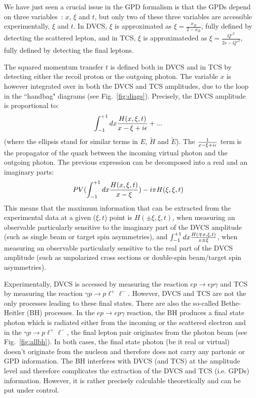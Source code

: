 We have just seen a crucial issue in the GPD formalism is that the GPDs 
depend on three variables~: $x$, $\xi$ and $t$, but only two of these 
three variables are accessible experimentally, $\xi$ and $t$.
In DVCS, $\xi$ is approximated as $\xi=\frac{x_B}{2-x_B}$, fully
defined by detecting the scattered lepton, and in TCS, $\xi$
is approximateded as $\xi=\frac{Q'^2}{2s-Q'^2}$, fully defined by 
detecting the final leptons.%

The squared momentum transfer $t$ is defined both in DVCS and in TCS by 
detecting either the recoil proton or the outgoing photon.
The variable $x$ is however integrated over in both the DVCS and TCS
amplitudes, due to the loop in the ``handbag" diagrams (see Fig.~\ref{fig:diags}).
Precisely, the DVCS amplitude is proportional to:
\begin{eqnarray}
\int_{-1}^{+1}d x {{H(x,\xi,t)} \over {x - \xi + i \epsilon}}+...
\end{eqnarray}
(where the ellipsis stand for similar terms in $E$, $\tilde{H}$
and $\tilde{E}$). 
The ${1} \over {x - \xi + i \epsilon}$ term is the propagator of the quark 
between the incoming virtual photon and the outgoing photon.
The previous expression can be decomposed into a real and an imaginary parts:
\begin{eqnarray}
PV(\int_{-1}^{+1}d x {H(x,\xi,t) \over {x - \xi}})-i\pi H(\xi,\xi,t)
\end{eqnarray}
This means that the maximum information that can be extracted from the experimental 
data at a given ($\xi,t$) point is $H(\pm\xi,\xi,t)$, when measuring an observable
particularly sensitive to the imaginary part of the DVCS amplitude (such as single beam 
or target spin asymmetries), and $\int_{-1}^{+1}d x {H(\mp x,\xi,t) 
\over {x \pm \xi}}$, when measuring an observable particularly
sensitive to the real part of the DVCS amplitude (such as unpolarized
cross sections or double-spin beam/target spin asymmetries).

Experimentally, DVCS is accessed by measuring the reaction $ep\to e p\gamma$
and TCS by measuring the reaction $\gamma p\to p \ell^+\ell^-$. However,
DVCS and TCS are not the only processes leading to these final states. There
are also the so-called Bethe-Heitler (BH) processes. In the $ep\to e p\gamma$ reaction,
the BH produces a final state photon which is radiated either
from the incoming or the scattered electron and in the $\gamma p\to p \ell^+\ell^-$,
the final lepton pair originates from the photon beam (see Fig.~\ref{fig:allbh}). 
In both cases, the final state photon (be it real or virtual) doesn't originate
from the nucleon and therefore does not carry any partonic or GPD information.
The BH interferes with DVCS (and TCS) at the amplitude level and
therefore complicates the extraction of the DVCS and TCS (i.e. GPDs) information.
However, it is rather precisely calculable theoretically and can be put
under control.

